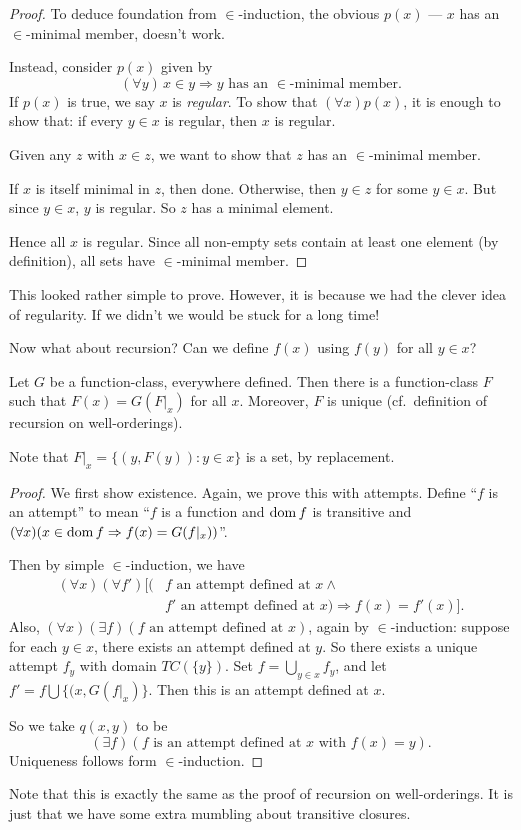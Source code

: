\documentclass[a4paper]{article}
\begin{document}
\begin{proof}
  To deduce foundation from $\in$-induction, the obvious $p(x)$ --- $x$ has an $\in$-minimal member, doesn't work.

  Instead, consider $p(x)$ given by
  \[
    (\forall y)\,x\in y \Rightarrow y\text{ has an }\in\text{-minimal member}.
  \]
  If $p(x)$ is true, we say $x$ is \emph{regular}. To show that $(\forall x)p(x)$, it is enough to show that: if every $y\in x$ is regular, then $x$ is regular.

  Given any $z$ with $x\in z$, we want to show that $z$ has an $\in$-minimal member.

  If $x$ is itself minimal in $z$, then done. Otherwise, then $y\in z$ for some $y\in x$. But since $y\in x$, $y$ is regular. So $z$ has a minimal element.

  Hence all $x$ is regular. Since all non-empty sets contain at least one element (by definition), all sets have $\in$-minimal member.
\end{proof}
This looked rather simple to prove. However, it is because we had the clever idea of regularity. If we didn't we would be stuck for a long time!

Now what about recursion? Can we define $f(x)$ using $f(y)$ for all $y\in x$?

\begin{thm}
  Let $G$ be a function-class, everywhere defined. Then there is a function-class $F$ such that $F(x) = G(F|_x)$ for all $x$. Moreover, $F$ is unique (cf.\ definition of recursion on well-orderings).
\end{thm}
Note that $F|_x = \{(y, F(y)): y\in x\}$ is a set, by replacement.

\begin{proof}
  We first show existence. Again, we prove this with attempts. Define ``$f$ is an attempt'' to mean ``$f$ is a function and $\operatorname{dom} f$ is transitive and $(\forall x)(x\in \operatorname{dom} f \Rightarrow f(x) = G(f|_x))$''.

  Then by simple $\in$-induction, we have
  \begin{align*}
    (\forall x)(\forall f')[(&f\text{ an attempt defined at }x\wedge\\
    & f'\text{ an attempt defined at $x$}) \Rightarrow f(x) = f'(x)].
  \end{align*}
  Also, $(\forall x)(\exists f)(f\text{ an attempt defined at }x)$, again by $\in$-induction: suppose for each $y\in x$, there exists an attempt defined at $y$. So there exists a unique attempt $f_y$ with domain $TC(\{y\})$. Set $f = \bigcup_{y\in x}f_y$, and let $f' = f\bigcup \{(x, G(f|_x)\}$. Then this is an attempt defined at $x$.

  So we take $q(x, y)$ to be
  \[
    (\exists f)(f\text{ is an attempt defined at }x\text{ with }f(x) = y).
  \]
  Uniqueness follows form $\in$-induction.
\end{proof}
Note that this is exactly the same as the proof of recursion on well-orderings. It is just that we have some extra mumbling about transitive closures.
\end{document}
